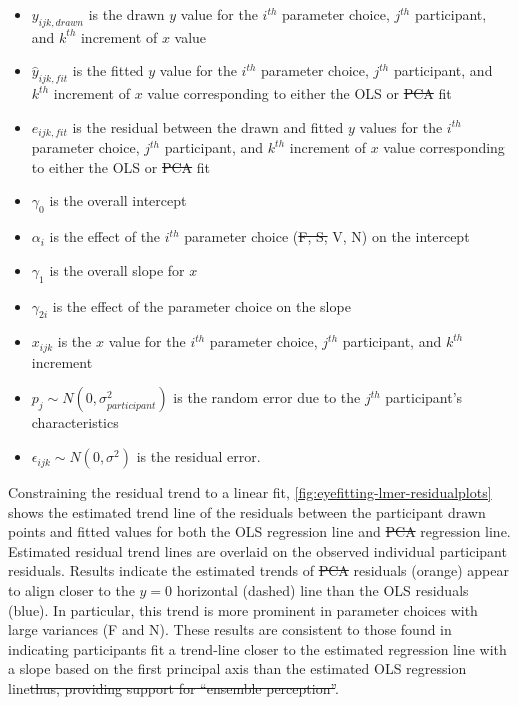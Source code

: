 \documentclass[12pt]{article}
\providecommand{\tightlist}{%
  \setlength{\itemsep}{0pt}\setlength{\parskip}{0pt}}
\providecommand{\DIFaddtex}[1]{{\protect\color{blue}\uwave{#1}}} %
\providecommand{\DIFdeltex}[1]{{\protect\color{red}\sout{#1}}}                      %
\providecommand{\DIFaddbegin}{} %
\providecommand{\DIFaddend}{} %
\providecommand{\DIFdelbegin}{} %
\providecommand{\DIFdelend}{} %
\providecommand{\DIFadd}[1]{\texorpdfstring{\DIFaddtex{#1}}{#1}} %
\providecommand{\DIFdel}[1]{\texorpdfstring{\DIFdeltex{#1}}{}} %
\newcommand{\DIFscaledelfig}{0.5}
\newlength{\DIFdelgraphicswidth} %
\newlength{\DIFdelgraphicsheight} %
\newcommand{\DIFaddincludegraphics}[2][]{{\color{blue}\fbox{\DIFOincludegraphics[#1]{#2}}}} %
\newcommand{\DIFdelincludegraphics}[2][]{%
\sbox{\DIFdelgraphicsbox}{\DIFOincludegraphics[#1]{#2}}%
\settoboxwidth{\DIFdelgraphicswidth}{\DIFdelgraphicsbox} %
\settoboxtotalheight{\DIFdelgraphicsheight}{\DIFdelgraphicsbox} %
\scalebox{\DIFscaledelfig}{%
\parbox[b]{\DIFdelgraphicswidth}{\usebox{\DIFdelgraphicsbox}\\[-\baselineskip] \rule{\DIFdelgraphicswidth}{0em}}\llap{\resizebox{\DIFdelgraphicswidth}{\DIFdelgraphicsheight}{%
\setlength{\unitlength}{\DIFdelgraphicswidth}%
\begin{picture}(1,1)%
\thicklines\linethickness{2pt} %
{\color[rgb]{1,0,0}\put(0,0){\framebox(1,1){}}}%
{\color[rgb]{1,0,0}\put(0,0){\line( 1,1){1}}}%
{\color[rgb]{1,0,0}\put(0,1){\line(1,-1){1}}}%
\end{picture}%
}\hspace*{3pt}}} %
} %
\DeclareRobustCommand{\DIFaddbegin}{\DIFOaddbegin \let\includegraphics\DIFaddincludegraphics} %
\DeclareRobustCommand{\DIFaddend}{\DIFOaddend \let\includegraphics\DIFOincludegraphics} %
\DeclareRobustCommand{\DIFdelbegin}{\DIFOdelbegin \let\includegraphics\DIFdelincludegraphics} %
\DeclareRobustCommand{\DIFdelend}{\DIFOaddend \let\includegraphics\DIFOincludegraphics} %
\begin{document}
\begin{itemize}
\tightlist
\item
  \(y_{ijk,drawn}\) is the drawn \(y\) value for the \(i^{th}\)
  parameter choice, \(j^{th}\) participant, and \(k^{th}\) increment of
  \(x\) value
\item
  \(\hat y_{ijk,fit}\) is the fitted \(y\) value for the \(i^{th}\)
  parameter choice, \(j^{th}\) participant, and \(k^{th}\) increment of
  \(x\) value corresponding to either the OLS or \DIFdelbegin \DIFdel{PCA }\DIFdelend \DIFaddbegin \DIFadd{PA }\DIFaddend fit
\item
  \(e_{ijk,fit}\) is the residual between the drawn and fitted \(y\)
  values for the \(i^{th}\) parameter choice, \(j^{th}\) participant,
  and \(k^{th}\) increment of \(x\) value corresponding to either the
  OLS or \DIFdelbegin \DIFdel{PCA }\DIFdelend \DIFaddbegin \DIFadd{PA }\DIFaddend fit
\item
  \(\gamma_0\) is the overall intercept
\item
  \(\alpha_i\) is the effect of the \(i^{th}\) parameter choice (\DIFdelbegin \DIFdel{F, S, }\DIFdelend \DIFaddbegin \DIFadd{S, F,
  }\DIFaddend V, N) on the intercept
\item
  \(\gamma_1\) is the overall slope for \(x\)
\item
  \(\gamma_{2i}\) is the effect of the parameter choice on the slope
\item
  \(x_{ijk}\) is the \(x\) value for the \(i^{th}\) parameter choice,
  \(j^{th}\) participant, and \(k^{th}\) increment
\item
  \(p_{j} \sim N(0, \sigma^2_{participant})\) is the random error due to
  the \(j^{th}\) participant's characteristics
\item
  \(\epsilon_{ijk} \sim N(0, \sigma^2)\) is the residual error.
\end{itemize}

Constraining the residual trend to a linear fit,
\cref{fig:eyefitting-lmer-residualplots} shows the estimated trend line
of the residuals between the participant drawn points and fitted values
for both the OLS regression line and \DIFdelbegin \DIFdel{PCA }\DIFdelend \DIFaddbegin \DIFadd{PA }\DIFaddend regression line. Estimated
residual trend lines are overlaid on the observed individual participant
residuals. Results indicate the estimated trends of \DIFdelbegin \DIFdel{PCA }\DIFdelend \DIFaddbegin \DIFadd{PA }\DIFaddend residuals
(orange) appear to align closer to the \(y=0\) horizontal (dashed) line
than the OLS residuals (blue). In particular, this trend is more
prominent in parameter choices with large variances (F and N). These
results are consistent to those found in \citet{mosteller1981eye}
indicating participants fit a trend-line closer to the estimated
regression line with a slope based on the first principal axis than the
estimated OLS regression line\DIFdelbegin \DIFdel{thus, providing support for ``ensemble
perception''}\DIFdelend .
\end{document}
